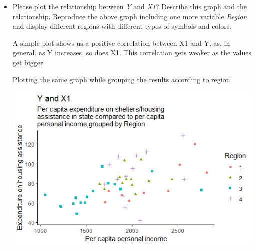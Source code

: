 \documentclass[12pt,letterpaper]{article}
\begin{document}
\begin{itemize}
\vspace{.5cm}
\item
Please plot the relationship between \emph{Y} and \emph{X1}? Describe this graph and the relationship. Reproduce the above graph including one more variable \emph{Region} and display different regions with different types of symbols and colors.

A simple plot shows us a positive correlation between X1 and Y, as, in general, as Y increases, so does X1. This correlation gets weaker as the values get bigger.



Plotting the same graph while grouping the results according to region.

 

\includegraphics{YandX1byRegion}

\end{itemize}
\end{document}

